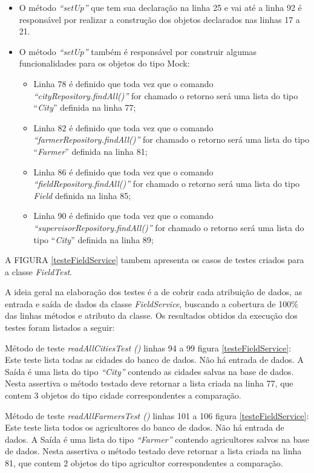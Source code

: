 \begin{itemize}
 \item O método \textit{“setUp”} que tem sua declaração na linha 25 e vai até a linha 92 é responsável por realizar a construção dos objetos declarados nas linhas 17 a 21.

\item O método  \textit{“setUp”} também é responsável por construir algumas funcionalidades para os objetos do tipo Mock:

\begin{itemize}

 \item Linha  78 é definido que toda vez que o comando \textit{“cityRepository.findAll()”} for chamado o retorno será uma lista do tipo “\textit{City}” definida na linha 77;
\item Linha  82 é definido que toda vez que o comando \textit{“farmerRepository.findAll()”} for chamado o retorno será uma lista do tipo “\textit{Farmer}” definida na linha 81;
\item Linha  86 é definido que toda vez que o comando \textit{“fieldRepository.findAll()”} for chamado o retorno será uma lista do tipo \textit{Field} definida na linha 85;
\item Linha  90 é definido que toda vez que o comando\textit{ “supervisorRepository.findAll()”} for chamado o retorno será uma lista do tipo “\textit{City}” definida na linha 89;
\end{itemize}{}
\end{itemize}{}


A FIGURA \ref{testeFieldService} tambem apresenta os casos de testes criados para a classe \textit{FieldTest}. 


A ideia geral na elaboração dos testes é a de cobrir cada atribuição de dados, as entrada e saída de dados da classe \textit{FieldService}, buscando a cobertura de 100\% das linhas métodos e atributo da classe. Os resultados obtidos da execução dos testes foram listados a seguir:


Método de teste \textit{readAllCitiesTest ()} linhas 94 a 99 figura \ref{testeFieldService}: Este teste lista todas as cidades do banco de dados. Não há entrada de dados. A Saída é uma lista do tipo \textit{“City”} contendo as cidades salvas na base de dados. Nesta assertiva o método testado deve retornar a lista criada na linha 77, que contem 3 objetos do tipo cidade correspondentes a comparação.

Método de teste \textit{ readAllFarmersTest ()} linhas 101 a 106 figura \ref{testeFieldService}: Este teste lista todos os agricultores do banco de dados. Não há entrada de dados. A Saída é uma lista do tipo \textit{“Farmer”} contendo agricultores salvos na base de dados. Nesta assertiva o método testado deve retornar a lista criada na linha 81, que contem 2 objetos do tipo agricultor correspondentes a comparação.

